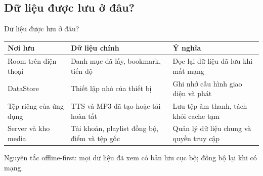 \subsection{Dữ liệu được lưu ở đâu?}
\begin{frame}{Dữ liệu được lưu ở đâu?}
\small
\centering
\begin{tabular}{@{}p{3.0cm}p{5.4cm}p{5.6cm}@{}}
\toprule
\textbf{Nơi lưu} & \textbf{Dữ liệu chính} & \textbf{Ý nghĩa} \\
\midrule
Room trên điện thoại & Danh mục đã lấy, bookmark, tiến độ & Đọc lại dữ liệu đã lưu khi mất mạng \\
DataStore & Thiết lập nhỏ của thiết bị & Ghi nhớ cấu hình giao diện và phát \\
Tệp riêng của ứng dụng & TTS và MP3 đã tạo hoặc tải hoàn tất & Lưu tệp âm thanh, tách khỏi cache tạm \\
Server và kho media & Tài khoản, playlist đồng bộ, điểm và tệp gốc & Quản lý dữ liệu chung và quyền truy cập \\
\bottomrule
\end{tabular}

\vspace{0.3cm}
{\footnotesize\color{TextGray} Nguyên tắc offline-first: mọi dữ liệu đã xem có bản lưu cục bộ; đồng bộ lại khi có mạng.}
\end{frame}

